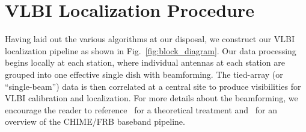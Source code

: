 \section{VLBI Localization Procedure}
Having laid out the various algorithms at our disposal, we construct our VLBI localization pipeline as shown in Fig.~\ref{fig:block_diagram}. Our data processing begins locally at each station, where individual antennas at each station are grouped into one effective single dish with beamforming. The tied-array (or ``single-beam'') data is then correlated at a central site to produce visibilities for VLBI calibration and localization. For more details about the beamforming, we encourage the reader to reference~\citep{masui2019algorithms} for a theoretical treatment and~\citep{michilli2020analysis} for an overview of the CHIME/FRB baseband pipeline.

